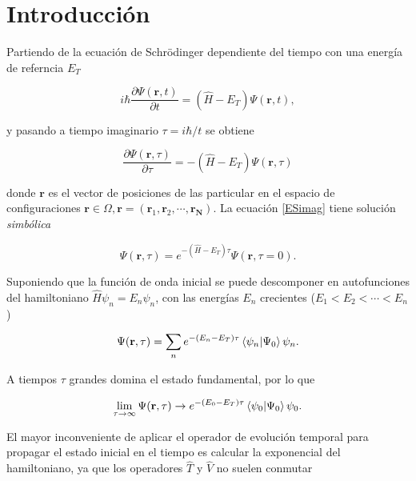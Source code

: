 \documentclass[11pt,a4paper,twoside,pdf]{article}
\numberwithin{equation}{section}
\begin{document}

\tableofcontents


\pagestyle{fancy}
\fancyhead[RO,LE]{\leftmark}
\fancyhead[LO,RE]{\thepage}
\fancyfoot{}



\newpage


\section{Introducción}


Partiendo de la ecuación de Schrödinger dependiente del tiempo con una energía de referncia $E_T$

\begin{equation}
    i\hbar \frac{\partial \Psi (\mathbf{r}, t) }{\partial t} = (\hat{H} - E_T) \Psi (\mathbf{r}, t),
\end{equation}


y pasando a tiempo imaginario $\tau = i\hbar/t$ se obtiene 

\begin{equation}
    \frac{\partial \Psi (\mathbf{r}, \tau) }{\partial \tau} = -(\hat{H} - E_T) \Psi (\mathbf{r}, \tau)
\label{ESimag}
\end{equation}

donde $\mathbf{r}$ es el vector de posiciones de las particular en el espacio de configuraciones $\mathbf{r} \in \Omega, \mathbf{r} = (\mathbf{r}_1, \mathbf{r}_2, \cdots, \mathbf{r_N}).$ La ecuación \ref{ESimag} tiene solución \textit{simbólica}

$$
    \Psi (\mathbf{r}, \tau) = e^{-(\hat{H}-E_T)\tau} \Psi (\mathbf{r}, \tau=0).
$$


Suponiendo que la función de onda inicial se puede descomponer en autofunciones del hamiltoniano $\hat{H}\psi_n = E_n\psi_n$, con las energías $E_n$ crecientes ($E_1 < E_2 < \cdots < E_n$)

$$
    \Psi (\mathbf{r}, \tau) = \sum_{n} e^{-(E_n-E_T)\tau} \braket{\psi_n|\Psi_0} \psi_n.
$$

A tiempos $\tau$ grandes domina el estado fundamental, por lo que

$$
    \lim_{\tau \to \infty} \Psi(\mathbf{r}, \tau) \to e^{-(E_0-E_T)\tau} \braket{\psi_0|\Psi_0} \psi_0.
$$




El mayor inconveniente de aplicar el operador de evolución temporal para propagar el estado inicial en el tiempo es calcular la exponencial del hamiltoniano, ya que los operadores $\hat{T}$ y $\hat{V}$ no suelen conmutar
\end{document}
